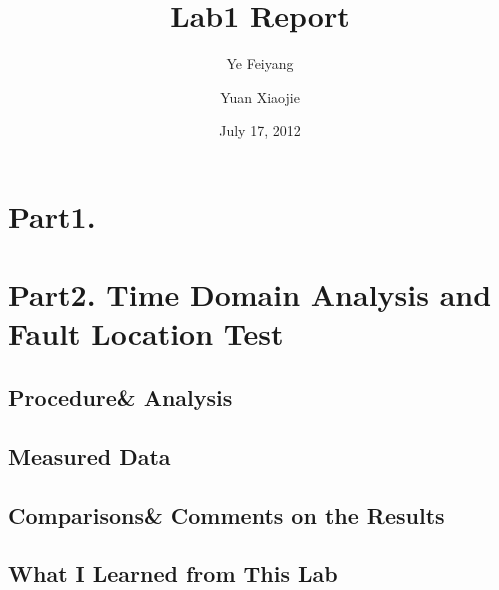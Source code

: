 \documentclass[11pt,oneside,a4paper]{report}
\begin{document}
\title{Lab1 Report}
\author{Ye Feiyang \and Yuan Xiaojie}
\date{July 17, 2012}
\maketitle

\section{Part1. }

\section{Part2. Time Domain Analysis and Fault Location Test}
\subsection{Procedure\& Analysis}

\subsection{Measured Data}

\subsection{Comparisons\& Comments on the Results}

\subsection{What I Learned from This Lab}
\end{document}
